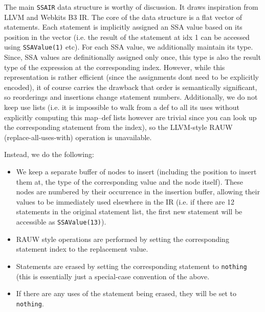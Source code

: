 The main \texttt{SSAIR} data structure is worthy of discussion. It draws inspiration from LLVM and Webkit{\textquotesingle}s B3 IR. The core of the data structure is a flat vector of statements. Each statement is implicitly assigned an SSA value based on its position in the vector (i.e. the result of the statement at idx 1 can be accessed using \texttt{SSAValue(1)} etc). For each SSA value, we additionally maintain its type. Since, SSA values are definitionally assigned only once, this type is also the result type of the expression at the corresponding index. However, while this representation is rather efficient (since the assignments don{\textquotesingle}t need to be explicitly encoded), it of course carries the drawback that order is semantically significant, so reorderings and insertions change statement numbers. Additionally, we do not keep use lists (i.e. it is impossible to walk from a def to all its uses without explicitly computing this map–def lists however are trivial since you can look up the corresponding statement from the index), so the LLVM-style RAUW (replace-all-uses-with) operation is unavailable.



Instead, we do the following:



\begin{itemize}
\item We keep a separate buffer of nodes to insert (including the position to insert them at, the type of the corresponding value and the node itself). These nodes are numbered by their occurrence in the insertion buffer, allowing their values to be immediately used elsewhere in the IR (i.e. if there are 12 statements in the original statement list, the first new statement will be accessible as \texttt{SSAValue(13)}).


\item RAUW style operations are performed by setting the corresponding statement index to the replacement value.


\item Statements are erased by setting the corresponding statement to \texttt{nothing} (this is essentially just a special-case convention of the above.


\item If there are any uses of the statement being erased, they will be set to \texttt{nothing}.

\end{itemize}


